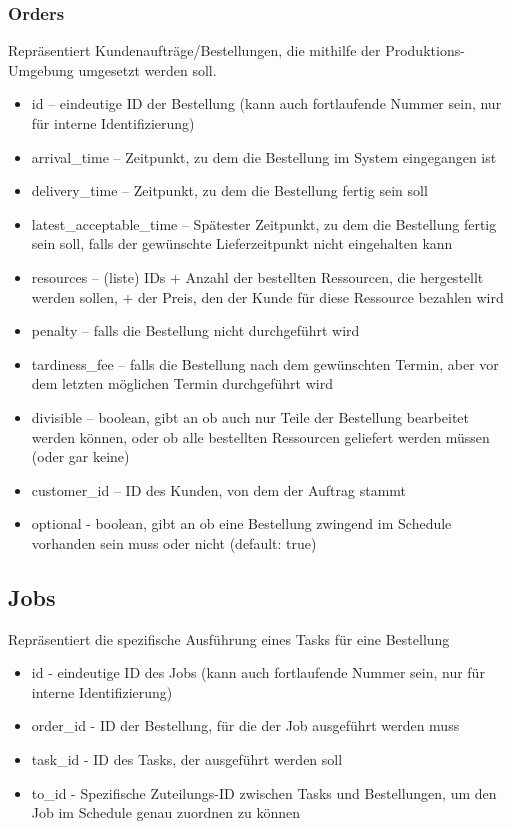 \documentclass[a4paper,12pt,twoside]{scrreprt}
\begin{document}
\subsubsection*{Orders}
Repräsentiert Kundenaufträge/Bestellungen, die mithilfe der Produktions-Umgebung umgesetzt werden soll.
\begin{itemize}
	\item id – eindeutige ID der Bestellung (kann auch fortlaufende Nummer sein, nur für interne Identifizierung)
	\item arrival\_time – Zeitpunkt, zu dem die Bestellung im System eingegangen ist
	\item delivery\_time – Zeitpunkt, zu dem die Bestellung fertig sein soll
	\item latest\_acceptable\_time – Spätester Zeitpunkt, zu dem die Bestellung fertig sein soll, 
	falls der gewünschte Lieferzeitpunkt nicht eingehalten kann
	\item resources – (liste) IDs + Anzahl der bestellten Ressourcen, die hergestellt werden sollen, + der Preis, den der Kunde für diese Ressource bezahlen wird
	\item penalty – falls die Bestellung nicht durchgeführt wird
	\item tardiness\_fee – falls die Bestellung nach dem gewünschten Termin, aber vor dem letzten möglichen Termin durchgeführt wird
	\item divisible – boolean, gibt an ob auch nur Teile der Bestellung bearbeitet werden können, oder ob alle bestellten Ressourcen geliefert werden müssen (oder gar keine)
	\item customer\_id – ID des Kunden, von dem der Auftrag stammt
	\item optional - boolean, gibt an ob eine Bestellung zwingend im Schedule vorhanden sein muss oder nicht (default: true)
\end{itemize}

\subsection*{Jobs}
Repräsentiert die spezifische Ausführung eines Tasks für eine Bestellung
\begin{itemize}
	\item id - eindeutige ID des Jobs (kann auch fortlaufende Nummer sein, nur für interne Identifizierung)
	\item order\_id - ID der Bestellung, für die der Job ausgeführt werden muss
	\item task\_id - ID des Tasks, der ausgeführt werden soll
	\item to\_id - Spezifische Zuteilungs-ID zwischen Tasks und Bestellungen, um den Job im Schedule genau zuordnen zu können
\end{itemize}
\end{document}

